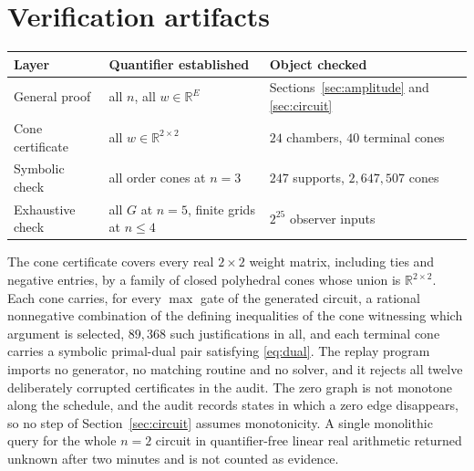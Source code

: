 \documentclass[11pt]{article}
\begin{document}
\section{Verification artifacts}
\label{app:verify}

\begin{center}
\begin{tabular}{@{}lll@{}}
\toprule
Layer & Quantifier established & Object checked \\
\midrule
General proof
  & all $n$, all $w\in\mathbb R^{E}$
  & Sections~\ref{sec:amplitude} and \ref{sec:circuit} \\
Cone certificate
  & all $w\in\mathbb R^{2\times2}$
  & $24$ chambers, $40$ terminal cones \\
Symbolic check
  & all order cones at $n=3$
  & $247$ supports, $2{,}647{,}507$ cones \\
Exhaustive check
  & all $G$ at $n=5$, finite grids at $n\le4$
  & $2^{25}$ observer inputs \\
\bottomrule
\end{tabular}
\end{center}

The cone certificate covers every real $2\times2$ weight matrix, including ties
and negative entries, by a family of closed polyhedral cones whose union is
$\mathbb R^{2\times2}$.  Each cone carries, for every $\max$ gate of the
generated circuit, a rational nonnegative combination of the defining
inequalities of the cone witnessing which argument is selected, $89{,}368$ such
justifications in all, and each terminal cone carries a symbolic primal-dual pair
satisfying \eqref{eq:dual}.  The replay program imports no generator, no matching
routine and no solver, and it rejects all twelve deliberately corrupted
certificates in the audit.  The zero graph is
not monotone along the schedule, and the audit records states in which a zero
edge disappears, so no step of Section~\ref{sec:circuit} assumes monotonicity.  A
single monolithic query for the whole $n=2$ circuit in quantifier-free linear
real arithmetic returned unknown after two minutes and is not counted as
evidence.
\end{document}
